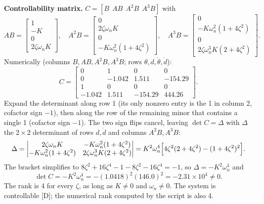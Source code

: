 \documentclass[11pt,a4paper]{article}
\begin{document}
\textbf{Controllability matrix.} $C=[B\ \ AB\ \ A^2B\ \ A^3B]$ with
\begin{equation*}
AB=\begin{bmatrix}1\\-K\\0\\2\zeta\omega_nK\end{bmatrix},\quad
A^2B=\begin{bmatrix}0\\2\zeta\omega_nK\\0\\-K\omega_n^2(1+4\zeta^2)\end{bmatrix},\quad
A^3B=\begin{bmatrix}0\\-K\omega_n^2(1+4\zeta^2)\\0\\2\zeta\omega_n^3K(2+4\zeta^2)\end{bmatrix}.
\end{equation*}
Numerically (columns $B,AB,A^2B,A^3B$; rows $\theta,d,\dot\theta,\dot d$):
\begin{equation*}
C=\begin{bmatrix}
0&1&0&0\\
0&-1.042&1.511&-154.29\\
1&0&0&0\\
-1.042&1.511&-154.29&444.26
\end{bmatrix}.
\end{equation*}
Expand the determinant along row 1 (its only nonzero entry is the 1 in column 2, cofactor sign $-1$), then along the row of the remaining minor that contains a single 1 (cofactor sign $-1$). The two sign flips cancel, leaving $\det C=\Delta$ with $\Delta$ the $2\times2$ determinant of rows $d,\dot d$ and columns $A^2B,A^3B$:
\begin{equation*}
\Delta=\begin{vmatrix}2\zeta\omega_nK&-K\omega_n^2(1+4\zeta^2)\\-K\omega_n^2(1+4\zeta^2)&2\zeta\omega_n^3K(2+4\zeta^2)\end{vmatrix}
=K^2\omega_n^4\Bigl[4\zeta^2(2+4\zeta^2)-(1+4\zeta^2)^2\Bigr].
\end{equation*}
The bracket simplifies to $8\zeta^2+16\zeta^4-1-8\zeta^2-16\zeta^4=-1$, so $\Delta=-K^2\omega_n^4$ and
\begin{equation*}
\boxed{\det C=-K^2\omega_n^4=-(1.0418)^2(146.0)^2=-2.31\times10^4\neq0 .}
\end{equation*}
The rank is 4 for every $\zeta$, as long as $K\ne0$ and $\omega_n\ne0$. The system is controllable [D]; the numerical rank computed by the script is also 4.
\end{document}
